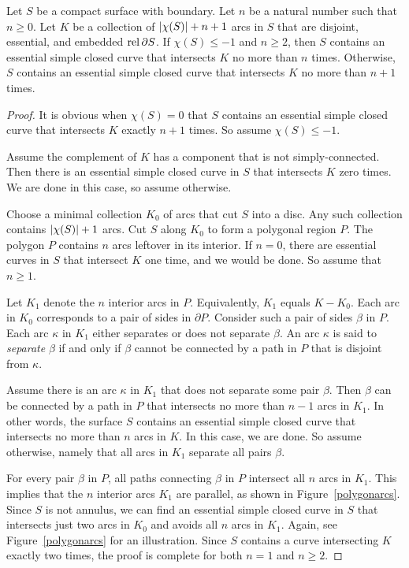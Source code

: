 \begin{lemma}
\label{arcs in S}
Let $S$ be a compact surface with boundary.  Let $n$ be a natural number such that $n\geq0$.  Let $K$ be a collection of $| \chi (S) |+n+1$ arcs in $S$ that are disjoint, essential, and embedded $\operatorname{rel} \partial S$.  If $\chi(S)\leq -1$ and $n\geq 2$, then $S$ contains an essential simple closed curve that intersects $K$ no more than $n$ times.  Otherwise, $S$ contains an essential simple closed curve that intersects $K$ no more than $n+1$ times.
\end{lemma}

\begin{proof}
It is obvious when $\chi(S)=0$ that $S$ contains an essential simple closed curve that intersects $K$ exactly $n+1$ times.  So assume $\chi(S)\leq -1$.

Assume the complement of $K$ has a component that is not simply-connected.  Then there is an essential simple closed curve in $S$ that intersects $K$ zero times.  We are done in this case, so assume otherwise.

Choose a minimal collection $K_{0}$ of arcs that cut $S$ into a disc.  Any such collection contains $| \chi (S) |+1$ arcs.  Cut $S$ along $K_{0}$ to form a polygonal region $P$.  The polygon $P$ contains $n$ arcs leftover in its interior.  If $n=0$, there are essential curves in $S$ that intersect $K$ one time, and we would be done.  So assume that $n\geq 1$.

Let $K_{1}$ denote the $n$ interior arcs in $P$.  Equivalently, $K_{1}$ equals $K-K_{0}$.  Each arc in $K_{0}$ corresponds to a pair of sides in $\partial P$.  Consider such a pair of sides $\beta$ in $P$.  Each arc $\kappa$ in $K_{1}$ either separates or does not separate $\beta$.  An arc $\kappa$ is said to \emph{separate} $\beta$ if and only if $\beta$ cannot be connected by a path in $P$ that is disjoint from $\kappa$.

Assume there is an arc $\kappa$ in $K_{1}$ that does not separate some pair $\beta$.  Then $\beta$ can be connected by a path in $P$ that intersects no more than $n-1$ arcs in $K_{1}$.  In other words, the surface $S$ contains an essential simple closed curve that intersects no more than $n$ arcs in $K$.  In this case, we are done.  So assume otherwise, namely that all arcs in $K_{1}$ separate all pairs $\beta$.

For every pair $\beta$ in $P$, all paths connecting $\beta$ in $P$ intersect all $n$ arcs in $K_{1}$.  This implies that the $n$ interior arcs $K_{1}$ are parallel, as shown in Figure~\ref{polygonarcs}.  Since $S$ is not annulus, we can find an essential simple closed curve in $S$ that intersects just two arcs in $K_{0}$ and avoids all $n$ arcs in $K_{1}$.  Again, see Figure~\ref{polygonarcs} for an illustration.  Since $S$ contains a curve intersecting $K$ exactly two times, the proof is complete for both $n=1$ and $n\geq 2$.
\end{proof}

